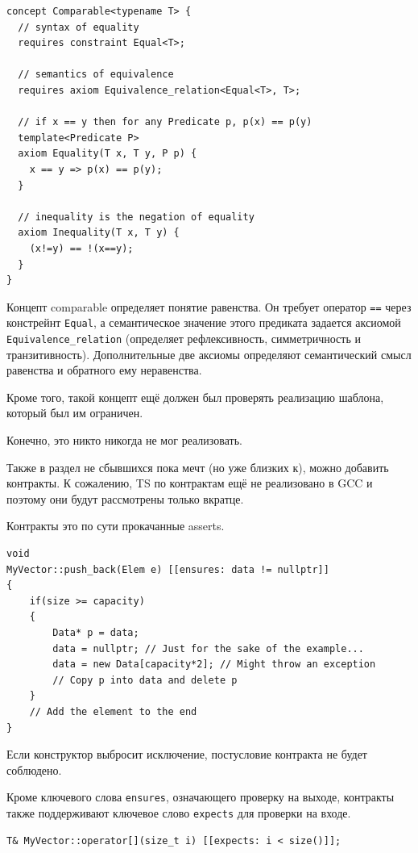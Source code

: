 \documentclass[a4paper,12pt,oneside]{article}
\begin{document}
\begin{lstlisting}
concept Comparable<typename T> {
  // syntax of equality
  requires constraint Equal<T>; 

  // semantics of equivalence
  requires axiom Equivalence_relation<Equal<T>, T>; 

  // if x == y then for any Predicate p, p(x) == p(y)
  template<Predicate P>
  axiom Equality(T x, T y, P p) {
    x == y => p(x) == p(y); 
  }

  // inequality is the negation of equality
  axiom Inequality(T x, T y) {
    (x!=y) == !(x==y); 
  }
}
\end{lstlisting}

Концепт comparable определяет понятие равенства. Он требует оператор \lstinline!==! через констрейнт \lstinline!Equal!, а семантическое значение этого предиката задается аксиомой \lstinline!Equivalence_relation! (определяет рефлексивность, симметричность и транзитивность). Дополнительные две аксиомы определяют семантический смысл равенства и обратного ему неравенства.

Кроме того, такой концепт ещё должен был проверять реализацию шаблона, который был им ограничен.

Конечно, это никто никогда не мог реализовать.

Также в раздел не сбывшихся пока мечт (но уже близких к), можно добавить контракты. К сожалению, TS по контрактам ещё не реализовано в GCC и поэтому они будут рассмотрены только вкратце.

Контракты это по сути прокачанные asserts.

\begin{lstlisting}
void 
MyVector::push_back(Elem e) [[ensures: data != nullptr]]
{
    if(size >= capacity)
    {
        Data* p = data;
        data = nullptr; // Just for the sake of the example...
        data = new Data[capacity*2]; // Might throw an exception
        // Copy p into data and delete p
    }
    // Add the element to the end
}
\end{lstlisting}

Если конструктор выбросит исключение, постусловие контракта не будет соблюдено.

Кроме ключевого слова \lstinline!ensures!, означающего проверку на выходе, контракты также поддерживают ключевое слово \lstinline!expects! для проверки на входе.

\begin{lstlisting}
T& MyVector::operator[](size_t i) [[expects: i < size()]];
\end{lstlisting}
\end{document}
